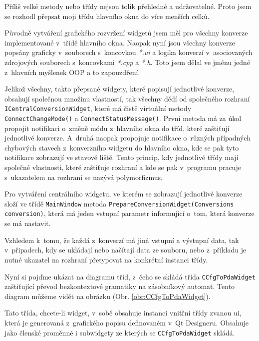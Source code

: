 
Příliš velké metody nebo třídy nejsou tolik přehledné a udržovatelné. Proto jsem se rozhodl přepsat moji třídu hlavního okna do více menších celků.

Původně vytváření grafického rozvržení widgetů jsem měl pro všechny konverze implementované v~třídě hlavního okna. Naopak nyní jsou všechny konverze popsány graficky v~souborech s~koncovkou \textit{*.ui} a logika konverzí v~asociovaných zdrojových souborech s~koncovkami \textit{*.cpp} a \textit{*.h}. Toto jsem dělal ve jménu jedné z~hlavních myšlenek OOP a to zapouzdření.

Jelikož všechny, takto přepsané widgety, které popisují jednotlivé konverze, obsahují společnou množinu vlastností, tak všechny dědí od společného rozhraní \\ \texttt{ICentralConversionWidget}, které má čistě virtuální metody \texttt{ConnectChangeMode()} a \texttt{ConnectStatusMessage()}. První metoda má za úkol propojit notifikaci o~změně módu z~hlavního okna do tříd, které zaštiťují jednotlivé konverze. A~druhá naopak propojuje notifikace o~různých případných chybových stavech z~konverzního widgetu do hlavního okna, kde se pak tyto notifikace zobrazují ve stavové liště. Tento princip, kdy jednotlivé třídy mají společné vlastnosti, které zaštiťuje rozhraní a kde se pak v~programu pracuje s~ukazatelem na rozhraní se nazývá polymorfizmus.

Pro vytváření centrálního widgetu, ve kterém se zobrazují jednotlivé konverze složí ve třídě \texttt{MainWindow} metoda \texttt{PrepareConversionWidget(Conversions conversion)}, která má jeden vstupní parametr informující o~tom, která konverze se má nastavit.

Vzhledem k~tomu, že každá z~konverzí má jiná vstupní a výstupní data, tak v~připadech, kdy se ukládají nebo načítají data ze souboru, nebo z~příkladu je nutné ukazatel na rozhraní přetypovat na konkrétní instanci třídy.


Nyní si pojďme ukázat na diagramu tříd, z~čeho se skládá třída \texttt{CCfgToPdaWidget} zaštiťující převod bezkontextové gramatiky na zásobníkový automat. Tento diagram můžeme vidět na obrázku (Obr. \ref{obr:CCfgToPdaWidget}).


Tato třída, chcete-li widget, v~sobě obsahuje instanci vnitřní třídy zvanou ui, která je generovaná z~grafického popisu definovaném v~Qt Designeru. Obsahuje jako členské proměnné i subwidgety ze kterých se \texttt{CCfgToPdaWidget} skládá.

